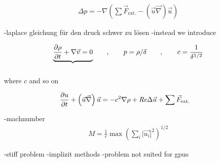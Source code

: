 \begin{align}
    \Delta p =  -\nabla \left( \sum \vec{F}_{\text{ext.}} - (\vec{u} \vec{\nabla}) \vec{u}\right)
\end{align}

-laplace gleichung für den druck schwer zu lösen
-instead we introduce

\begin{align}
    \underbrace{\pdn[\rho]{t} +  \nabla \vec{v} = 0}_{\label{bla}} \qquad , \qquad p =\rho/\delta \qquad, \qquad c=\frac{1}{\delta^{1/2}}
\end{align}

where $c$ and so on

\begin{align}
    \label{numerik:nsac}
    \pdn[u]{t} + \left(\vec{u} \vec{\nabla}\right) \vec{u} &= -c^2\nabla\rho + \Rey \Delta \vec{u}+\sum \vec{F}_{\text{ext.}}
\end{align}

-machnumber
\begin{align}
    M = \frac{1}{c}\max\left(\sum_i |\vec{u_i}]^2\right)^{1/2}
\end{align}


-stiff problem
-implizit methods
-problem not suited for gpus
